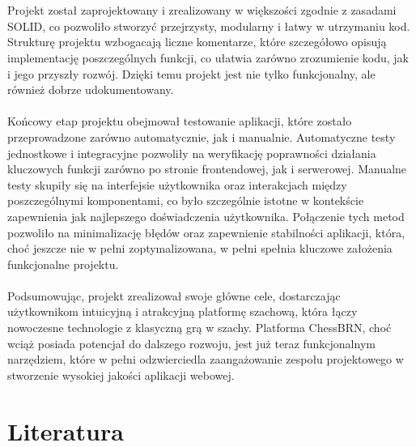 \documentclass[twoside]{projektInzynierskiMS1}
\begin{document}
\\\\
Projekt został zaprojektowany i zrealizowany w większości zgodnie z zasadami SOLID, co pozwoliło stworzyć przejrzysty, modularny i łatwy w utrzymaniu kod. Strukturę projektu wzbogacają liczne komentarze, które szczegółowo opisują implementację poszczególnych funkcji, co ułatwia zarówno zrozumienie kodu, jak i jego przyszły rozwój. Dzięki temu projekt jest nie tylko funkcjonalny, ale również dobrze udokumentowany.
\\\\
Końcowy etap projektu obejmował testowanie aplikacji, które zostało przeprowadzone zarówno automatycznie, jak i manualnie. Automatyczne testy jednostkowe i integracyjne pozwoliły na weryfikację poprawności działania kluczowych funkcji zarówno po stronie frontendowej, jak i serwerowej. Manualne testy skupiły się na interfejsie użytkownika oraz interakcjach między poszczególnymi komponentami, co było szczególnie istotne w kontekście zapewnienia jak najlepszego doświadczenia użytkownika. Połączenie tych metod pozwoliło na minimalizację błędów oraz zapewnienie stabilności aplikacji, która, choć jeszcze nie w pełni zoptymalizowana, w pełni spełnia kluczowe założenia funkcjonalne projektu.
\\\\
Podsumowując, projekt zrealizował swoje główne cele, dostarczając użytkownikom intuicyjną i atrakcyjną platformę szachową, która łączy nowoczesne technologie z klasyczną grą w szachy. Platforma ChessBRN, choć wciąż posiada potencjał do dalszego rozwoju, jest już teraz funkcjonalnym narzędziem, które w pełni odzwierciedla zaangażowanie zespołu projektowego w stworzenie wysokiej jakości aplikacji webowej.

\newpage

\section{Literatura}
\end{document}
